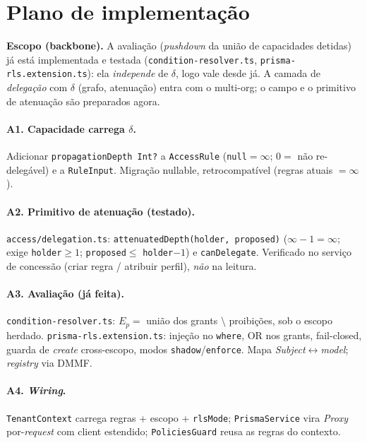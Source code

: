 \documentclass[11pt,a4paper]{article}
\theoremstyle{definition}
\newcommand{\dep}{\delta}
\begin{document}
\appendix
\section{Plano de implementação}\label{ap:plano}

\textbf{Escopo (backbone).} A avaliação (\emph{pushdown} da união de
capacidades detidas) já está implementada e testada
(\texttt{condition-resolver.ts}, \texttt{prisma-rls.extension.ts}): ela
\emph{independe} de $\dep$, logo vale desde já. A camada de \emph{delegação}
com $\dep$ (grafo, atenuação) entra com o multi-org; o campo e o primitivo de
atenuação são preparados agora.

\paragraph{A1. Capacidade carrega $\dep$.}
Adicionar \texttt{propagationDepth Int?} a \texttt{AccessRule}
(\texttt{null}$=\infty$; $0=$ não re-delegável) e a \texttt{RuleInput}. Migração
nullable, retrocompatível (regras atuais $=\infty$).

\paragraph{A2. Primitivo de atenuação (testado).}
\texttt{access/delegation.ts}: \texttt{attenuatedDepth(holder, proposed)}
($\infty-1=\infty$; exige \texttt{holder}$\ge1$; \texttt{proposed}$\le$
\texttt{holder}$-1$) e \texttt{canDelegate}. Verificado no serviço de
concessão (criar regra / atribuir perfil), \emph{não} na leitura.

\paragraph{A3. Avaliação (já feita).}
\texttt{condition-resolver.ts}: $E_p=$ união dos grants $\setminus$ proibições,
sob o escopo herdado. \texttt{prisma-rls.extension.ts}: injeção no
\texttt{where}, OR nos grants, fail-closed, guarda de \emph{create}
cross-escopo, modos \texttt{shadow}/\texttt{enforce}. Mapa
\emph{Subject}$\leftrightarrow$\emph{model}; \emph{registry} via DMMF.

\paragraph{A4. \emph{Wiring}.}
\texttt{TenantContext} carrega regras + escopo + \texttt{rlsMode};
\texttt{PrismaService} vira \emph{Proxy} por-\emph{request} com client
estendido; \texttt{PoliciesGuard} reusa as regras do contexto.
\end{document}
